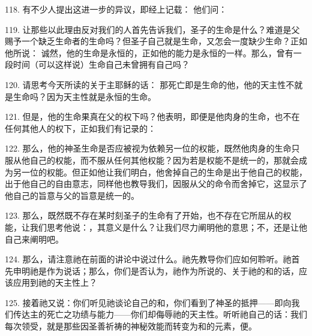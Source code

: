 118. 有不少人提出这进一步的异议，即经上记载： 他们问：\par

119. 让那些以此理由反对我们的人首先告诉我们，圣子的生命是什么？难道是父赐予一个缺乏生命者的生命吗？但圣子自己就是生命，又怎会一度缺少生命？正如他所说： 诚然，他的生命是永恒的，正如他的能力是永恒的一样。那么，曾有一段时间（可以这样说）生命自己未曾拥有自己吗？\par

120. 请思考今天所读的关于主耶稣的话： 那死亡即是生命的他，他的天主性不就是生命吗？因为天主性就是永恒的生命。\par

121. 但是，他的生命果真在父的权下吗？他表明，即便是他肉身的生命，也不在任何其他人的权下，正如我们有记录的：\par

122. 那么，他的神圣生命是否应被视为依赖另一位的权能，既然他肉身的生命只服从他自己的权能，而不服从任何其他权能？因为若是权能不是统一的，那就会成为另一位的权能。但正如他让我们明白，他舍掉自己的生命是出于他自己的权能，出于他自己的自由意志，同样他也教导我们，因服从父的命令而舍掉它，这显示了他自己的旨意与父的旨意是统一的。\par

123. 那么，既然既不存在某时刻圣子的生命有了开始，也不存在它所屈从的权能，让我们思考他说：，其意义是什么？让我们尽力阐明他的意思；不，还是让他自己来阐明吧。\par

124. 那么，请注意祂在前面的讲论中说过什么。祂先教导你们应如何聆听。祂首先申明祂是作为说话；那么，你们是否认为，祂作为所说的、关于祂的和的话，应该应用到祂的天主性上？\par

125. 接着祂又说：你们听见祂谈论自己的和，你们看到了神圣的抵押——即向我们传达主的死亡之功绩与能力——你们却侮辱祂的天主性。听听祂自己的话：我们每次领受，就是那些因圣善祈祷的神秘效能而转变为和的元素，便。\par

